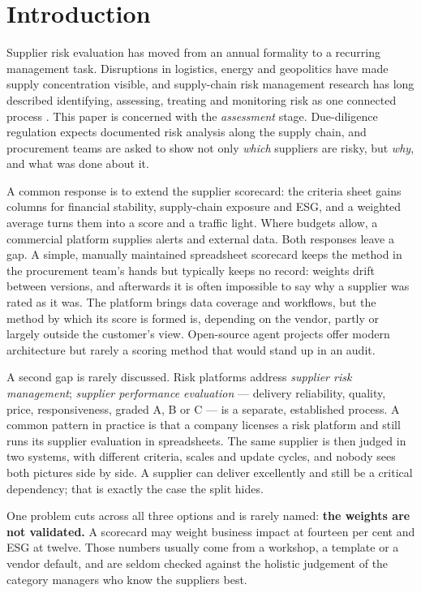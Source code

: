 \documentclass[10pt,twocolumn,a4paper]{article}
\begin{document}
\section{Introduction}
\label{sec:intro}

Supplier risk evaluation has moved from an annual formality to a recurring management
task. Disruptions in logistics, energy and geopolitics have made supply concentration
visible, and supply-chain risk management research has long described identifying,
assessing, treating and monitoring risk as one connected process
\cite{tang2006,ho2015,fan2018}. This paper is concerned with the \emph{assessment}
stage. Due-diligence regulation expects documented risk analysis along the supply chain,
and procurement teams are asked to show not only \emph{which} suppliers are risky, but
\emph{why}, and what was done about it.

A common response is to extend the supplier scorecard: the criteria sheet gains columns
for financial stability, supply-chain exposure and ESG, and a weighted average turns
them into a score and a traffic light. Where budgets allow, a commercial platform
supplies alerts and external data. Both responses leave a gap. A simple, manually
maintained spreadsheet scorecard keeps the method in the procurement team's hands but
typically keeps no record: weights drift between versions, and afterwards it is often
impossible to say why a supplier was rated as it was. The
platform brings data coverage and workflows, but the method by which its score is formed
is, depending on the vendor, partly or largely outside the customer's view. Open-source
agent projects offer modern architecture but rarely a scoring method that would stand
up in an audit.

A second gap is rarely discussed. Risk platforms address \emph{supplier risk
management}; \emph{supplier performance evaluation} --- delivery reliability, quality,
price, responsiveness, graded A, B or C --- is a separate, established process. A common
pattern in practice is that a company licenses a risk platform and still runs its
supplier evaluation in spreadsheets. The same supplier is then judged in two systems,
with different criteria, scales and update cycles, and nobody sees both pictures side by
side. A supplier can deliver excellently and still be a critical dependency; that is
exactly the case the split hides.

One problem cuts across all three options and is rarely named: \textbf{the weights are
not validated.} A scorecard may weight business impact at fourteen per cent and ESG at
twelve. Those numbers usually come from a workshop, a template or a vendor default, and
are seldom checked against the holistic judgement of the category managers who know the
suppliers best.
\end{document}
